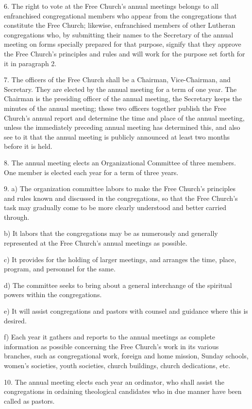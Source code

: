 6. The right to vote at the Free Church’s annual meetings belongs to all enfranchised congregational members who appear from the congregations that constitute the Free Church; likewise, enfranchised members of other Lutheran congregations who, by submitting their names to the Secretary of the annual meeting on forms specially prepared for that purpose, signify that they approve the Free Church’s principles and rules and will work for the purpose set forth for it in paragraph 2.

7. The officers of the Free Church shall be a Chairman, Vice-Chairman, and Secretary. They are elected by the annual meeting for a term of one year. The Chairman is the presiding officer of the annual meeting, the Secretary keeps the minutes of the annual meeting; these two officers together publish the Free Church’s annual report and determine the time and place of the annual meeting, unless the immediately preceding annual meeting has determined this, and also see to it that the annual meeting is publicly announced at least two months before it is held.

8. The annual meeting elects an Organizational Committee of three members. One member is elected each year for a term of three years.

9. a) The organization committee labors to make the Free Church’s principles and rules known and discussed in the congregations, so that the Free Church’s task may gradually come to be more clearly understood and better carried through.

b) It labors that the congregations may be as numerously and generally represented at the Free Church’s annual meetings as possible.

c) It provides for the holding of larger meetings, and arranges the time, place, program, and personnel for the same.

d) The committee seeks to bring about a general interchange of the spiritual powers within the congregations.

e) It will assist congregations and pastors with counsel and guidance where this is desired.

f) Each year it gathers and reports to the annual meetings as complete information as possible concerning the Free Church’s work in its various branches, such as congregational work, foreign and home mission, Sunday schools, women’s societies, youth societies, church buildings, church dedications, etc.

10. The annual meeting elects each year an ordinator, who shall assist the congregations in ordaining theological candidates who in due manner have been called as pastors.

